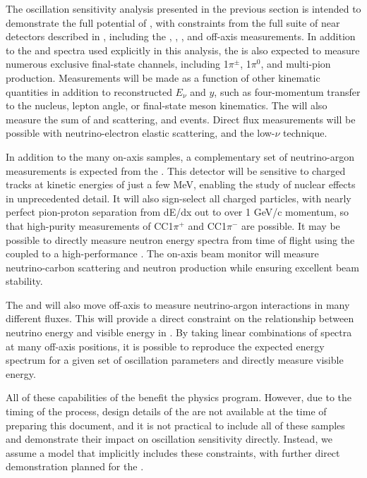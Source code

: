The oscillation sensitivity analysis presented in the previous section is intended to demonstrate the full potential of , with constraints from the full suite of near detectors described in \introchnd, including the  , , 
, 
and off-axis measurements. In addition to the \numu and \anumu {} spectra used explicitly in this analysis, the   is also expected to measure numerous exclusive final-state  channels, including 1$\pi^{\pm}$, 1$\pi^0$, and multi-pion production. Measurements will be made as a function of other kinematic quantities in addition to reconstructed $E_{\nu}$ and $y$, such as four-momentum transfer to the nucleus, lepton angle, or final-state meson kinematics. The   will also measure the sum of \nue and \anue {} scattering, and  events. Direct flux measurements will be possible with neutrino-electron elastic scattering, and the low-$\nu$ technique.

In addition to the many on-axis  samples, a complementary set of neutrino-argon measurements is expected from the  . This detector will be sensitive to charged tracks at kinetic energies of just a few MeV, enabling the study of nuclear effects in unprecedented detail. It will also sign-select all charged particles, with nearly perfect pion-proton separation from dE/dx out to over 1 GeV/c momentum, so that high-purity measurements of CC1$\pi^{+}$ and CC1$\pi^{-}$ are possible. It may be possible to directly measure neutron energy spectra from time of flight using the   coupled to a high-performance . 
%
The  on-axis beam monitor
%
will measure neutrino-carbon scattering and neutron production while ensuring excellent beam stability.

The  and  will also move off-axis to measure neutrino-argon interactions in many different fluxes. This will provide a direct constraint on the relationship between neutrino energy and visible energy in . By taking linear combinations of spectra at many off-axis positions, it is possible to reproduce the expected  energy spectrum for a given set of oscillation parameters and directly measure visible energy.

All of these capabilities of the  benefit the  physics program. However, due to the timing of the  process, design details of the  are not available at the time of preparing this document, and it is not practical to include all of these samples and demonstrate their impact on oscillation sensitivity directly. Instead, we assume a model that implicitly includes these constraints, with further direct demonstration planned for the  .

